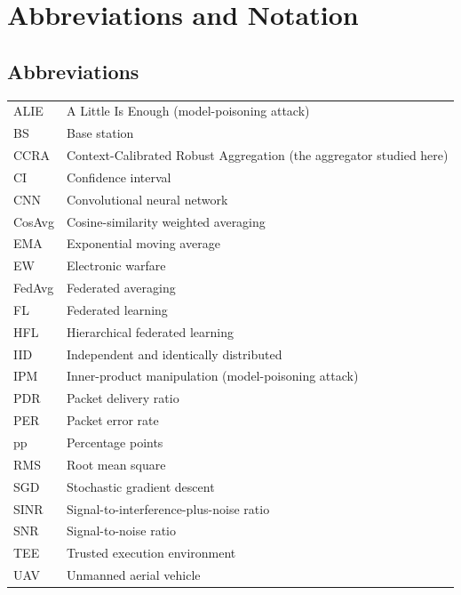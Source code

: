 \chapter*{Abbreviations and Notation}

\section*{Abbreviations}
\begin{longtable}{@{}p{32mm}p{122mm}@{}}
ALIE & A Little Is Enough (model-poisoning attack) \\
BS & Base station \\
CCRA & Context-Calibrated Robust Aggregation (the aggregator studied here) \\
CI & Confidence interval \\
CNN & Convolutional neural network \\
CosAvg & Cosine-similarity weighted averaging \\
EMA & Exponential moving average \\
EW & Electronic warfare \\
FedAvg & Federated averaging \\
FL & Federated learning \\
HFL & Hierarchical federated learning \\
IID & Independent and identically distributed \\
IPM & Inner-product manipulation (model-poisoning attack) \\
PDR & Packet delivery ratio \\
PER & Packet error rate \\
pp & Percentage points \\
RMS & Root mean square \\
SGD & Stochastic gradient descent \\
SINR & Signal-to-interference-plus-noise ratio \\
SNR & Signal-to-noise ratio \\
TEE & Trusted execution environment \\
UAV & Unmanned aerial vehicle \\
\end{longtable}


